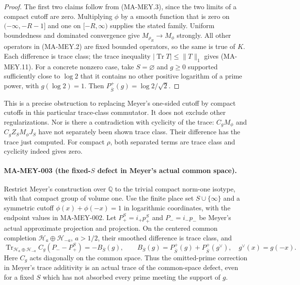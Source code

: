\begin{proof}
The first two claims follow from (MA-MEY.3), since the two
limits of a compact cutoff are zero.  Multiplying $\phi$ by
a smooth function that is zero on $(-\infty,-R-1]$ and one on
$[-R,\infty)$ supplies the stated family.  Uniform boundedness
and dominated convergence give $M_{\rho_R}\to M_\phi$ strongly.
All other operators in (MA-MEY.2) are fixed bounded operators,
so the same is true of $K$.  Each difference is trace class;
the trace inequality $|\operatorname{Tr}T|\le\|T\|_1$ gives
(MA-MEY.11).  For a concrete nonzero case, take $S=\varnothing$
and $g\ge0$ supported sufficiently close to $\log2$ that it
contains no other positive logarithm of a prime power, with
$g(\log2)=1$.  Then
$P_{\overline S}^+(g)=\log2/\sqrt2$.
\end{proof}

This is a precise obstruction to replacing Meyer's one-sided
cutoff by compact cutoffs in this particular trace-class
commutator.  It does not exclude other regularizations.
Nor is there a contradiction with cyclicity of the trace:
$C_gM_\phi$ and $C_gZ_SM_\phi J_S$ have not separately been
shown trace class.  Their difference has the trace just computed.
For compact $\rho$, both separated terms are trace class and
cyclicity indeed gives zero.

\paragraph{MA-MEY-003 (the fixed-$S$ defect in Meyer's actual common space).}
Restrict Meyer's construction over $\mathbb Q$ to the trivial
compact norm-one isotype, with that compact group of volume one.
Use the finite place set $S\cup\{\infty\}$ and a symmetric
cutoff $\phi(x)+\phi(-x)=1$ in logarithmic coordinates, with
the endpoint values in MA-MEY-002.  Let $P_+^S=i_+p_+^S$
and $P_-=i_-p_-$ be Meyer's actual approximate projection and
projection.  On the centered common completion
$\mathcal H_a\oplus\mathcal H_{-a}$, $a>1/2$, their smoothed
difference is trace class, and
\[
 \operatorname{Tr}_{\mathcal H_a\oplus\mathcal H_{-a}}
        C_g(P_- -P_+^S)
 =-B_{\overline S}(g),\qquad
 B_{\overline S}(g)=P_{\overline S}^+(g)
                         +P_{\overline S}^+(g^\vee),
 \quad g^\vee(x)=g(-x).
 \tag{MA-MEY.12}
\]
Here $C_g$ acts diagonally on the common space.  Thus the
omitted-prime correction in Meyer's trace additivity is an
actual trace of the common-space defect, even for a fixed $S$
which has not absorbed every prime meeting the support of $g$.


